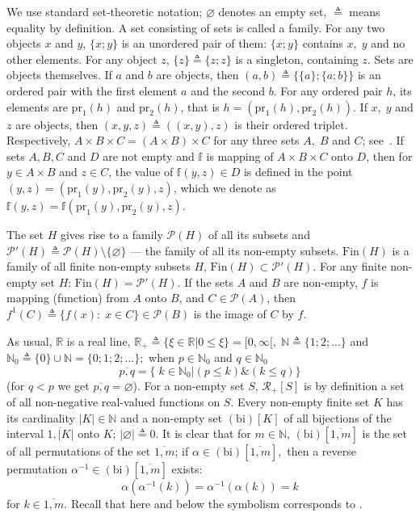 
We use standard set-theoretic notation;
$\varnothing$ denotes an empty set,
${\triangleq}$ means equality by definition.
A set consisting of sets
is called a family.
For any two objects $x$
and $y$,
$\{x;y\}$
is an unordered pair of them:
$\{x;y\}$ contains $x,\;y$
and no other elements.
For any object $z$,
$\{z\} {\triangleq} \{z;z\}$
is a singleton, containing
$z$.
Sets are objects themselves.
If $a$ and $b$ are objects, then
\cite[~67]{15}
$(a,b) {\triangleq} \{\{a\};\{a;b\}\}$
is an ordered pair with
the first element $a$
and the second $b$.
For any ordered pair $h$,
its elements are
$\mathrm{pr}_1(h)$
and
$\mathrm{pr}_2(h)$,
that is
$h = (\mathrm{pr} _1(h),\mathrm{pr} _2(h))$.
If $x,\;y$ and $z$ are objects,
then
$(x,y,z) {\triangleq} ((x,y),z)$
is their ordered triplet.
Respectively,
$A \times B \times C = (A \times B) \times C$
for any three sets
$A,\;B$ and $C$;
see~\cite[17]{16}.
If sets
$A, B, C$
and
$D$
are not empty and
$\mathbb{f}$
is mapping of
$A\times B\times C$ onto $D$,
then for
$y \in A\times B$
and
$z \in C$,
the value of
$\mathbb f(y,z)\in D$
is defined in the point
$(y,z) = (\mathrm{pr}_1(y), \mathrm{pr}_2(y), z)$,
which we denote as
$\mathbb f(y,z) = \mathbb f(\mathrm{pr}_1(y), \mathrm{pr}_2(y), z)$.

The set $H$
gives rise to a family $\mathcal{P}(H)$
of all its subsets
and $\mathcal{P}'(H) {\triangleq}
\mathcal{P}(H) \setminus \{\varnothing\}$
--- the family of all its non-empty subsets.
$\mathrm{Fin}(H)$
is a family of all finite
non-empty subsets
$H$,
$\mathrm{Fin}(H) \subset \mathcal{P}'(H)$.
For any finite non-empty set
$H$:
$\mathrm{Fin}(H) = \mathcal{P}'(H)$.
If the sets $A$ and $B$ are non-empty,
$f$ is mapping (function) from $A$ onto $B$,
and $C \in \mathcal{P}(A)$,
then
$f^1(C) {\triangleq} \{f(x):\;x \in C\} \in \mathcal{P}(B)$
is the image of $C$ by $f$.

As usual,
$\mathbb{R}$ is a real line,
$\mathbb{R}_+ {\triangleq} \{\xi \in \mathbb{R} \vert 0 \le \xi\} = [0,\infty[,\;\mathbb{N} {\triangleq} \{1;2;...\}$
and $\mathbb{N}_0 {\triangleq} \{0\} \cup \mathbb{N} = \{0;1;2;...\};$
when $p \in \mathbb{N}_0$
and $q \in \mathbb{N}_0$
$$
\overline{p,q} = \{\;k \in \mathbb{N}_0 \vert (p \le k) \& (k \le q)\}
$$
(for $q < p$ we get $\overline{p,q} = \varnothing$).
For a non-empty set
$S$,
$\mathcal{R}_+[S]$
is
by definition
a set of all non-negative real-valued functions on
$S$.
Every non-empty finite set $K$
has its cardinality
$|K| \in \mathbb{N}$
and a non-empty set $(\mathrm{bi})[K]$
of all bijections
\cite[87]{17}
of the interval
$\overline{1,|K|}$
onto $K$;
$|\varnothing| {\triangleq} 0$.
It is clear that for
$m \in \mathbb{N}$,
$(\mathrm{bi})[\overline{1,m}]$
is the set of all permutations
\cite[87]{17}
of the set
$\overline{1,m}$;
if
$\alpha \in (\mathrm{bi})[\overline{1,m}],$
then a reverse permutation
$\alpha^{-1} \in (\mathrm{bi})[\overline{1,m}]$
exists:
$$
    \alpha(\alpha^{-1}(k)) = \alpha^{-1}(\alpha(k)) = k
$$
for $k \in \overline{1,m}.$
Recall that here and below the symbolism corresponds to
\cite[$\S$3.1]{4}.

